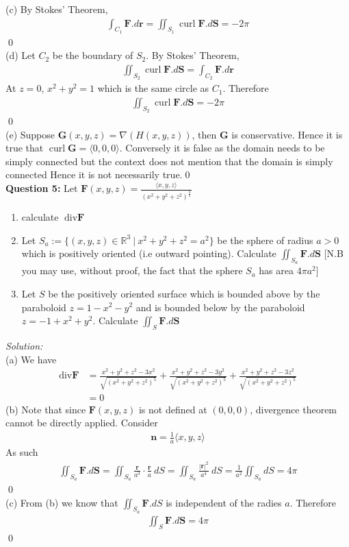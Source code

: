 \documentclass[12pt]{article}
\begin{document}
(c) By Stokes' Theorem,
\begin{align*}
     \int_{C_1}\textbf{F}.d\textbf{r}= \iint_{S_1}\operatorname{curl }\textbf{F}.d\textbf{S}=-2\pi
\end{align*}\qed\\[2em]
(d) Let $C_2$ be the boundary of $S_2$. By Stokes' Theorem,
\begin{align*}
    \iint_{S_2}\operatorname{curl }\textbf{F}.d\textbf{S}=\int_{C_2}\textbf{F}.d\textbf{r}
\end{align*}
At $z=0$, $x^2+y^2=1$ which is the same circle as $C_1$. Therefore
\begin{align*}
      \iint_{S_2}\operatorname{curl }\textbf{F}.d\textbf{S}=-2\pi
\end{align*}\qed\\[2em]
(e) Suppose $\textbf{G}(x,y,z)=\nabla(H(x,y,z))$, then $\textbf{G}$ is conservative. Hence it is true that $\operatorname{curl }\textbf{G}=\langle 0,0,0\rangle$. Conversely it is false as the domain needs to be simply connected but the context does not mention that the domain is simply connected Hence it is not necessarily true.\qed\\[2em]
\textbf{Question 5:} Let $\textbf{F}(x,y,z)=\frac{\langle x,y,z\rangle}{(x^2+y^2+z^2)^{\frac{3}{2}}}$
\begin{enumerate}[label=\alph*)]
    \item calculate $\operatorname{div \textbf{F}}$
    \item Let $S_a:=\{(x,y,z)\in\mathbb{R}^3\ |\ x^2+y^2+z^2=a^2\}$ be the sphere of radius $a>0$ which is positively oriented (i.e outward pointing). Calculate $\iint_{S_a}\textbf{F}.d\textbf{S}$ [N.B you may use, without proof, the fact that the sphere $S_a$ has area $4\pi a^2$]
    \item Let $S$ be the positively oriented surface which is bounded above by the paraboloid $z=1-x^2-y^2$ and is bounded below by the paraboloid $z=-1+x^2+y^2$. Calculate $\iint_S \textbf{F}.d\textbf{S}$
\end{enumerate}
\emph{Solution:} \\
(a) We have
\begin{align*}
    \operatorname{div} \textbf{F}&=\frac{x^2+y^2+z^2-3x^2}{\sqrt{(x^2+y^2+z^2)^5}}+\frac{x^2+y^2+z^2-3y^2}{\sqrt{(x^2+y^2+z^2)^5}}+\frac{x^2+y^2+z^2-3z^2}{\sqrt{(x^2+y^2+z^2)^5}}\\
    &=0
\end{align*}
(b) Note that since $\textbf{F}(x,y,z)$ is not defined at $(0,0,0)$, divergence theorem cannot be directly applied. Consider
\begin{align*}
    \textbf{n}=\frac{1}{a}\langle x,y,z\rangle
\end{align*}
As such
\begin{align*}
    \iint_{S_a}\textbf{F}.d\textbf{S}=\iint_{S_a}\frac{\textbf{r}}{a^3}\cdot \frac{\textbf{r}}{a}\ dS=\iint_{S_a}\frac{|\textbf{r}|^2}{a^4}\ d S=\frac{1}{a^2}\iint_{S_a}dS=4\pi
\end{align*}\qed\\[2em]
(c) From (b) we know that $\iint_{S_a}\textbf{F}.dS$ is independent of the radies $a$. Therefore
\begin{align*}
    \iint_S \textbf{F}.d\textbf{S}=4\pi
\end{align*}\qed
\end{document}
